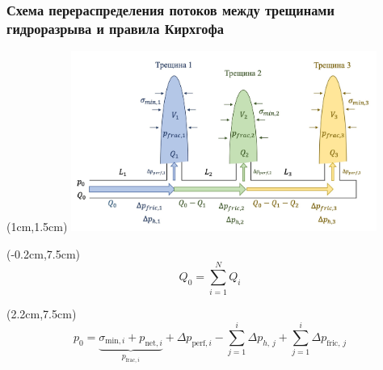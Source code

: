 \documentclass{beamer}
\begin{document}

\begin{frame}
\frametitle{Схема перераспределения потоков между трещинами гидроразрыва и правила Кирхгофа}

\begin{textblock*}{11cm}(1cm,1.5cm)
\includegraphics[width=10cm]{flow_distribution_scheme.jpg}
\end{textblock*}

\begin{textblock*}{4cm}(-0.2cm,7.5cm)
$$\boxed{Q_0=\sum\limits_{i=1}^{N}Q_i}$$
\end{textblock*}

\begin{textblock*}{11cm}(2.2cm,7.5cm)
$$\boxed{p_0=\underbrace{\sigma_{\text{min},i}+p_{\text{net},i}}_{p_{\text{frac},i}}+\Delta p_{\text{perf},i}-\sum_{j=1}^{i}{\Delta p_{h,\,j}}+\sum_{j=1}^{i}\Delta p_{\text{fric},\,j}}$$
\end{textblock*}

\end{frame}
\end{document}

